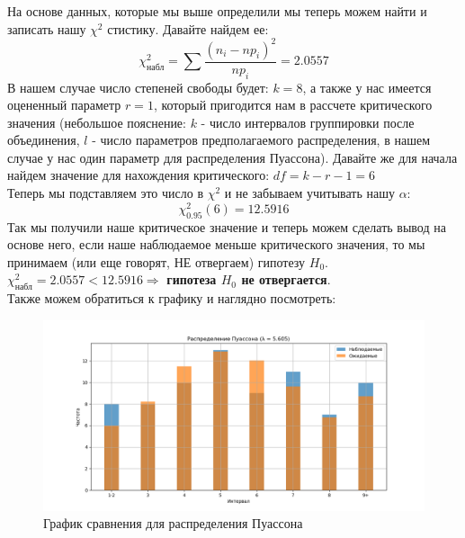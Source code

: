 \documentclass[12pt]{article}
\begin{document}
На основе данных, которые мы выше определили мы теперь можем найти и записать нашу $\chi^2$ стистику. Давайте найдем ее:
\[
\chi^2_{\text{набл}} = \sum \frac{(n_i - np_i)^2}{np_i} = 2.0557
\]
В нашем случае число степеней свободы будет: $k = 8$, а также у нас имеется оцененный параметр $r = 1$, который пригодится нам в рассчете критического значения 
(небольшое пояснение: $k$ - число интервалов группировки после объединения, $l$ - число параметров предполагаемого распределения, в нашем случае у нас один параметр для распределения Пуассона).
Давайте же для начала найдем значение для нахождения критического:
$df = k - r - 1 = 6$ \\
Теперь мы подставляем это число в $\chi^2$ и не забываем учитывать нашу $\alpha$:\\
$$\chi^2_{0.95}(6) = 12.5916$$
Так мы получили наше критическое значение и теперь можем сделать вывод на основе него, если наше наблюдаемое меньше критического значения, то мы принимаем (или еще говорят, НЕ отвергаем) гипотезу $H_0$.
$\chi^2_{\text{набл}} = 2.0557 < 12.5916 \Rightarrow$ \textbf{гипотеза $H_0$ не отвергается}.\\
\vspace{10mm}
Также можем обратиться к графику и наглядно посмотреть:
\begin{figure}[h]
\centering
\includegraphics[scale=0.5]{pois.png}
\caption{График сравнения для распределения Пуассона}    
\end{figure}
\end{document}
